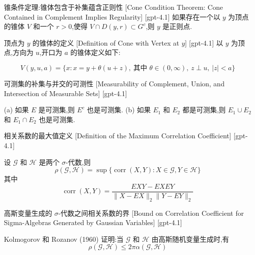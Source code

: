 \documentclass[UTF8]{ctexart}
\begin{document}
    
    
    \begin{thm}
        {锥条件定理:锥体包含于补集蕴含正则性}
        [Cone Condition Theorem: Cone Contained in Complement Implies Regularity]
        [gpt-4.1]
        如果存在一个以 $y$ 为顶点的锥体 $V$ 和一个 $r > 0$,使得 $V \cap D(y, r) \subset G^{c}$,则 $y$ 是正则点.
    \end{thm}
    
    
    
    \begin{dfn}
        {顶点为 $y$ 的锥体的定义}
        [Definition of Cone with Vertex at $y$]
        [gpt-4.1]
        以 $y$ 为顶点,方向为 $
u$,开口为 $a$ 的锥体定义如下:

\[
V(y, 
u, a) = \{ x : x = y + \theta(
u + z),~ \text{其中 } \theta \in (0, \infty),~ z \perp 
u,~ |z| < a \}
\]

    \end{dfn}
    
    
    
    \begin{ppt}
        {可测集的补集与并交的可测性}
        [Measurability of Complement, Union, and Intersection of Measurable Sets]
        [gpt-4.1]
        
(a) 如果 $E$ 是可测集,则 $E^{c}$ 也是可测集.
(b) 如果 $E_{1}$ 和 $E_{2}$ 都是可测集,则 $E_{1} \cup E_{2}$ 和 $E_{1} \cap E_{2}$ 也是可测集.

    \end{ppt}
    
    
    
    \begin{dfn}
        {相关系数的最大值定义}
        [Definition of the Maximum Correlation Coefficient]
        [gpt-4.1]
        
设 $\mathcal{G}$ 和 $\mathcal{H}$ 是两个 $\sigma$-代数,则
\[
\rho(\mathcal{G}, \mathcal{H}) = \sup \{ \operatorname{corr}(X, Y) : X \in \mathcal{G}, Y \in \mathcal{H} \}
\]
其中
\[
\operatorname{corr}(X, Y) = \frac{E X Y - E X E Y}{\| X - E X \|_{2} \| Y - E Y \|_{2}}
\]

    \end{dfn}
    
    
    
    \begin{thm}
        {高斯变量生成的 $\sigma$-代数之间相关系数的界}
        [Bound on Correlation Coefficient for Sigma-Algebras Generated by Gaussian Variables]
        [gpt-4.1]
        
Kolmogorov 和 Rozanov (1960) 证明:当 $\mathcal{G}$ 和 $\mathcal{H}$ 由高斯随机变量生成时,有
\[
\rho(\mathcal{G}, \mathcal{H}) \leq 2 \pi \alpha(\mathcal{G}, \mathcal{H})
\]

    \end{thm}
    
\end{document}
